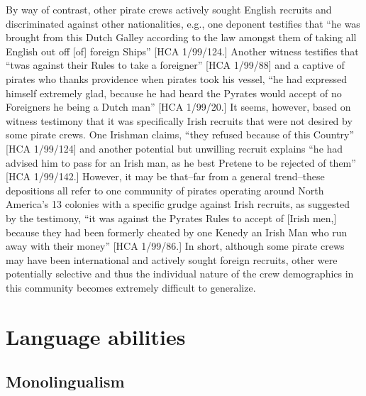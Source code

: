 By way of contrast, other pirate crews actively sought English recruits and discriminated against other nationalities, e.g., one deponent testifies that “he was brought from this Dutch Galley according to the law amongst them of taking all English out off [of]   foreign Ships” [HCA 1/99/124.] Another witness testifies that “twas against their Rules to take a foreigner” [HCA 1/99/88] and a captive of pirates who thanks providence when pirates took his vessel, “he had expressed himself extremely glad, because he had heard the Pyrates would accept of no Foreigners he being a Dutch man” [HCA 1/99/20.] It seems, however, based on witness testimony that it was specifically Irish recruits that were not desired by some pirate crews. One Irishman claims, “they refused because of this Country” [HCA 1/99/124] and another potential but unwilling recruit explains “he had advised him to pass for an Irish man, as he best Pretene to be rejected of them” [HCA 1/99/142.] However, it may be that--far from a general trend--these depositions all refer to one community of pirates operating around North America’s 13 colonies with a specific grudge against Irish recruits, as suggested by the testimony, “it was against the Pyrates Rules to accept of [Irish men,] because they had been formerly cheated by one Kenedy an Irish Man who run away with their money” [HCA 1/99/86.] In short, although some pirate crews may have been international and actively sought foreign recruits, other were potentially selective and thus the individual nature of the crew demographics in this community becomes extremely difficult to generalize.  

\section{\textbf{Language} \textbf{abilities} }%

\subsection{\textbf{Monolingualism}}%

